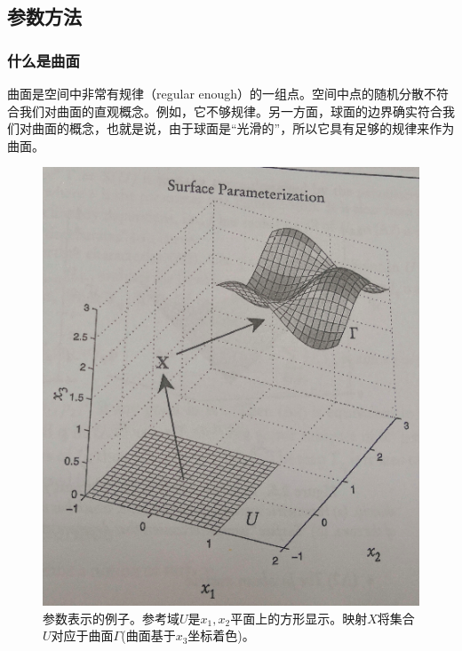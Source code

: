 \subsection{参数方法}
\subsubsection{什么是曲面}
曲面是空间中非常有规律（regular enough）的一组点。空间中点的随机分散不符合我们对曲面的直观概念。例如，它不够规律。另一方面，球面的边界确实符合我们对曲面的概念，也就是说，由于球面是“光滑的”，所以它具有足够的规律来作为曲面。
\begin{figure}[H]
\centering
\includegraphics[scale=0.5]{./figures/24.png}
\caption{参数表示的例子。参考域$U$是$x_1,x_2$平面上的方形显示。映射$X$将集合$U$对应于曲面$\Gamma$(曲面基于$x_3$坐标着色)。}
\end{figure}

